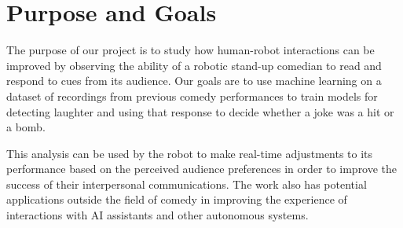 \documentclass[onecolumn, draftclsnofoot,10pt, compsoc]{IEEEtran}
\begin{document}
\section{Purpose and Goals}
The purpose of our project is to study how human-robot interactions can be improved by observing the ability of a robotic stand-up comedian to read and respond to cues from its audience. Our goals are to use machine learning on a dataset of recordings from previous comedy performances to train models for detecting laughter and using that response to decide whether a joke was a hit or a bomb.\par
\vspace{.3cm}
\noindent This analysis can be used by the robot to make real-time adjustments to its performance based on the perceived audience preferences in order to improve the success of their interpersonal communications. The work also has potential applications outside the field of comedy in improving the experience of interactions with AI assistants and other autonomous systems.
\end{document}
